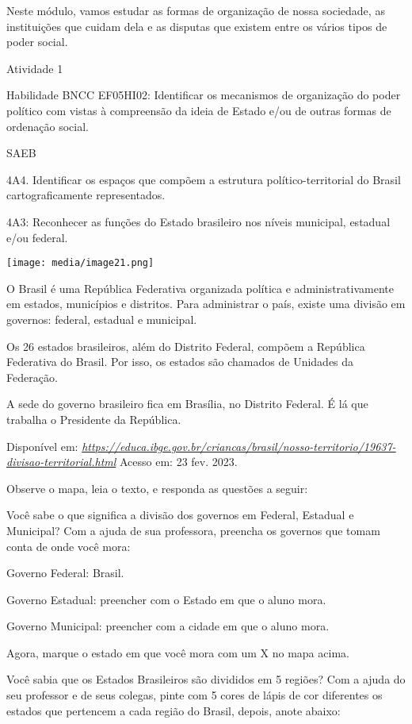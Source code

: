Neste módulo, vamos estudar as formas de organização de nossa sociedade,
as instituições que cuidam dela e as disputas que existem entre os
vários tipos de poder social.

Atividade 1

Habilidade BNCC EF05HI02: Identificar os mecanismos de organização do
poder político com vistas à compreensão da ideia de Estado e/ou de
outras formas de ordenação social.

SAEB

4A4. Identificar os espaços que compõem a estrutura político-territorial
do Brasil cartograficamente representados.

4A3: Reconhecer as funções do Estado brasileiro nos níveis municipal,
estadual e/ou federal.

\texttt{[image: media/image21.png]}

O Brasil é uma República Federativa organizada política e
administrativamente em estados, municípios e distritos. Para administrar
o país, existe uma divisão em governos: federal, estadual e municipal.

Os 26 estados brasileiros, além do Distrito Federal, compõem a República
Federativa do Brasil. Por isso, os estados são chamados de Unidades da
Federação.

A sede do governo brasileiro fica em Brasília, no Distrito Federal. É lá
que trabalha o Presidente da República.

Disponível em:
\href{https://educa.ibge.gov.br/criancas/brasil/nosso-territorio/19637-divisao-territorial.html}{\emph{https://educa.ibge.gov.br/criancas/brasil/nosso-territorio/19637-divisao-territorial.html}}
Acesso em: 23 fev. 2023.

Observe o mapa, leia o texto, e responda as questões a seguir:

Você sabe o que significa a divisão dos governos em Federal, Estadual e
Municipal? Com a ajuda de sua professora, preencha os governos que tomam
conta de onde você mora:

Governo Federal: Brasil.

Governo Estadual: preencher com o Estado em que o aluno mora.

Governo Municipal: preencher com a cidade em que o aluno mora.

Agora, marque o estado em que você mora com um X no mapa acima.

Você sabia que os Estados Brasileiros são divididos em 5 regiões? Com a
ajuda do seu professor e de seus colegas, pinte com 5 cores de lápis de
cor diferentes os estados que pertencem a cada região do Brasil, depois,
anote abaixo:

